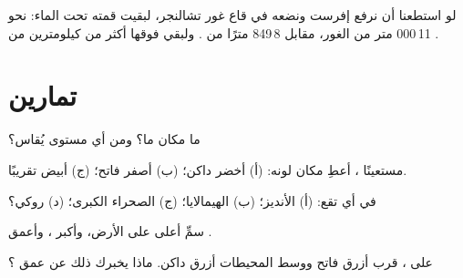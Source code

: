 \begin{example}\label{ex:g4:world-physical-map:everest-in-deep}
لو استطعنا أن نرفع  إفرست ونضعه في قاع غور تشالنجر، لبقيت قمته تحت
الماء: نحو 11\,000 متر من الغور، مقابل 8\,849 مترًا من . ولبقي فوقها
أكثر من كيلومترين من
.
\end{example}

\section{تمارين}

\begin{exercise}[$\star$]\label{exo:g4:world-physical-map:1}
ما  مكان ما؟ ومن أي مستوى يُقاس؟
\end{exercise}

\begin{exercise}[$\star$]\label{exo:g4:world-physical-map:2}
مستعينًا  ، أعطِ  مكان
لونه: (أ) أخضر داكن؛ (ب) أصفر فاتح؛ (ج) أبيض تقريبًا.
\end{exercise}

\begin{exercise}[$\star$]\label{exo:g4:world-physical-map:3}
في أي  تقع: (أ)  الأنديز؛ (ب)  الهيمالايا؛ (ج) الصحراء الكبرى؛
(د)  روكي؟
\end{exercise}

\begin{exercise}[$\star$]\label{exo:g4:world-physical-map:4}
سمِّ أعلى  على الأرض، وأكبر ، وأعمق .
\end{exercise}

\begin{exercise}[$\star$]\label{exo:g4:world-physical-map:5}
على ،  قرب  أزرق فاتح ووسط المحيطات أزرق
داكن. ماذا يخبرك ذلك عن عمق ؟
\end{exercise}

